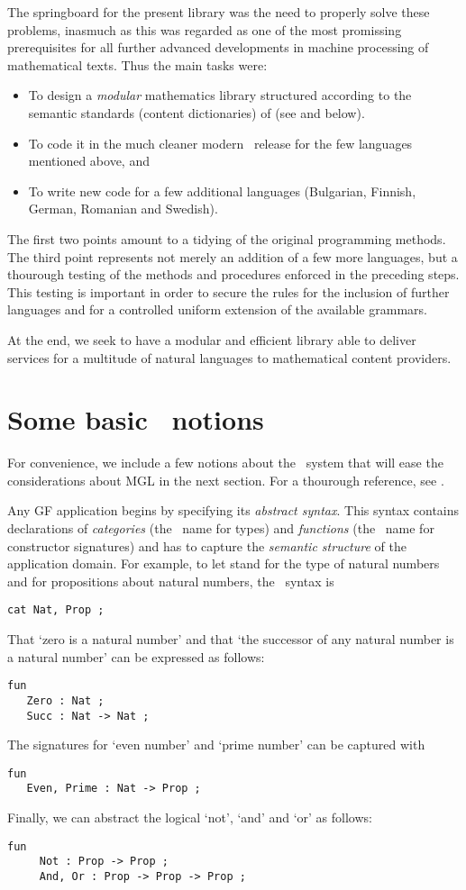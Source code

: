 \documentclass[adraft,copyright,creativecommons]{eptcs}
\begin{document}
The springboard for the present library was the need to properly solve
these problems, inasmuch as this was regarded as one of the most promissing
prerequisites for all further advanced developments in machine processing
of mathematical texts.  Thus the main tasks were:
\begin{itemize}
\item
To design a \emph{modular} mathematics library structured according to
the semantic standards (content dictionaries) of \openmath{}
(see \cite{OpenMath} and below).
\item
To code it in the much cleaner modern \GF\ release for the few languages
mentioned above, and
\item
To write new code for a few additional languages (Bulgarian, Finnish,
German, Romanian and Swedish).
\end{itemize}
The first two points amount to a tidying of the original \webalt{}
programming methods. The third point represents not merely an addition
of a few more languages, but a thourough testing of the methods and
procedures enforced in the preceding steps. This testing is important in
order to secure the rules for the inclusion of further languages and for
a controlled uniform extension of the available grammars.

At the end, we seek to have a modular and efficient library able
to deliver services for a multitude of natural languages to mathematical content providers.


\section{Some basic \GF\ notions}

For convenience, we include a few notions about the \GF\ 
system that will ease the considerations about MGL in the next section.
For a thourough reference, see \cite{Ranta11}.

Any GF application begins by specifying its \emph{abstract syntax}. This
syntax contains declarations of \emph{categories} (the \GF\  name for
types) and \emph{functions} (the \GF\ name for constructor signatures) and
has to capture the \emph{semantic structure} of the application domain.
For example, to let \Nat{} stand for the type of natural numbers and
\Prop{} for propositions about natural numbers, the \GF\ syntax is
\begin{lstlisting}
cat Nat, Prop ;    
\end{lstlisting}
That `zero is a natural number' and that `the successor of
any natural number is a natural number' can be expressed as follows:
\begin{lstlisting}
fun
   Zero : Nat ;
   Succ : Nat -> Nat ;
\end{lstlisting}
The signatures for `even number' and `prime number' can be captured with
\begin{lstlisting}
fun
   Even, Prime : Nat -> Prop ;	
\end{lstlisting}
Finally, we can abstract the logical `not', `and' and `or' as follows:
\begin{lstlisting}
fun
     Not : Prop -> Prop ;
     And, Or : Prop -> Prop -> Prop ;    
\end{lstlisting}
\end{document}
